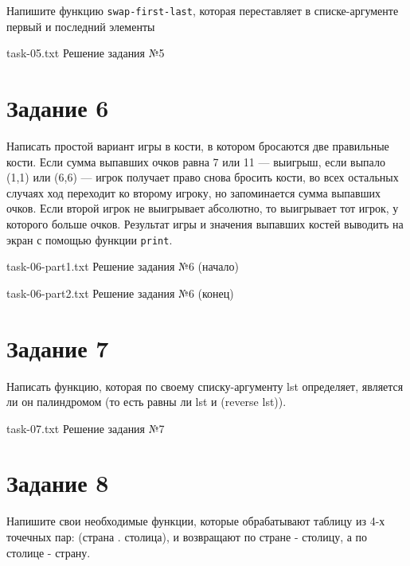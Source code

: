 Напишите функцию \texttt{swap-first-last}, которая переставляет в списке-аргументе первый и последний элементы

{task-05.txt} %
{Решение задания №5} %

\section{Задание 6}

Написать простой вариант игры в кости, в котором бросаются две правильные кости. Если сумма выпавших очков равна 7 или 11 --- выигрыш, если выпало (1,1) или (6,6) --- игрок получает право снова бросить кости, во всех остальных случаях ход переходит ко второму игроку, но запоминается сумма выпавших очков. Если второй игрок не выигрывает абсолютно, то выигрывает тот игрок, у которого больше очков. Результат игры и значения выпавших костей выводить на экран с помощью функции \texttt{print}.

{task-06-part1.txt} %
{Решение задания №6 (начало)} %

\clearpage

{task-06-part2.txt} %
{Решение задания №6 (конец)} %

\section{Задание 7}

Написать функцию, которая по своему списку-аргументу lst определяет, является ли он палиндромом (то есть равны ли lst и (reverse lst)).

{task-07.txt} %
{Решение задания №7} %

\section{Задание 8}

Напишите свои необходимые функции, которые обрабатывают таблицу из 4-х точечных пар: (страна . столица), и возвращают по стране - столицу, а по столице - страну.

\clearpage


